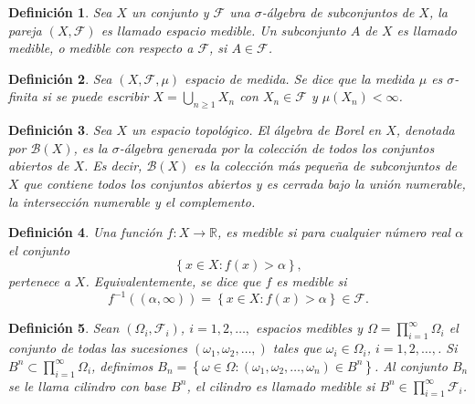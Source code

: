 \documentclass{article}
\newtheorem{Def}{Definición}[section]
\newcommand{\rea}{\mathbb{R}}
\numberwithin{equation}{section}
\begin{document}
\begin{Def}
Sea $X$ un conjunto y $\mathcal{F}$ una $\sigma$-\'algebra de subconjuntos de $X$, la pareja $\left(X,\mathcal{F}\right)$ es llamado espacio medible. Un subconjunto $A$ de $X$ es llamado medible, o medible con respecto a $\mathcal{F}$, si $A\in\mathcal{F}$.
\end{Def}

\begin{Def}
Sea $\left(X,\mathcal{F},\mu\right)$ espacio de medida. Se dice que la medida $\mu$ es $\sigma$-finita si se puede escribir $X=\bigcup_{n\geq1}X_{n}$ con $X_{n}\in\mathcal{F}$ y $\mu\left(X_{n}\right)<\infty$.
\end{Def}

\begin{Def}\label{Cto.Borel}
Sea $X$ un espacio topológico. El álgebra de Borel en $X$, denotada por $\mathcal{B}(X)$, es la $\sigma$-álgebra generada por la colección de todos los conjuntos abiertos de $X$. Es decir, $\mathcal{B}(X)$ es la colección más pequeña de subconjuntos de $X$ que contiene todos los conjuntos abiertos y es cerrada bajo la unión numerable, la intersección numerable y el complemento.
\end{Def}

\begin{Def}\label{Funcion.Medible}
Una funci\'on $f:X\rightarrow\rea$, es medible si para cualquier n\'umero real $\alpha$ el conjunto \[\left\{x\in X:f\left(x\right)>\alpha\right\},\] pertenece a $X$. Equivalentemente, se dice que $f$ es medible si \[f^{-1}\left(\left(\alpha,\infty\right)\right)=\left\{x\in X:f\left(x\right)>\alpha\right\}\in\mathcal{F}.\]
\end{Def}


\begin{Def}\label{Def.Cilindros}
Sean $\left(\Omega_{i},\mathcal{F}_{i}\right)$, $i=1,2,\ldots,$ espacios medibles y $\Omega=\prod_{i=1}^{\infty}\Omega_{i}$ el conjunto de todas las sucesiones $\left(\omega_{1},\omega_{2},\ldots,\right)$ tales que $\omega_{i}\in\Omega_{i}$, $i=1,2,\ldots,$. Si $B^{n}\subset\prod_{i=1}^{\infty}\Omega_{i}$, definimos $B_{n}=\left\{\omega\in\Omega:\left(\omega_{1},\omega_{2},\ldots,\omega_{n}\right)\in B^{n}\right\}$. Al conjunto $B_{n}$ se le llama {\em cilindro} con base $B^{n}$, el cilindro es llamado medible si $B^{n}\in\prod_{i=1}^{\infty}\mathcal{F}_{i}$.
\end{Def}
\end{document}
